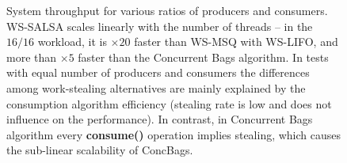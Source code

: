 \begin{figure}[htb]
	\centering
	\caption{\footnotesize{System throughput for various ratios of producers and consumers. WS-SALSA scales linearly with the number of threads -- in the $16/16$ workload, it is $\times20$ faster than WS-MSQ with WS-LIFO, and more than $\times5$ faster than the Concurrent Bags algorithm. In tests with equal number of producers and consumers the differences among work-stealing alternatives are mainly explained by the consumption algorithm efficiency (stealing rate is low and does not influence on the performance). In contrast, in Concurrent Bags algorithm every {\bf consume()} operation implies stealing, which causes the sub-linear scalability of ConcBags.
}}
	\label{fig:throughput}
\end{figure}

